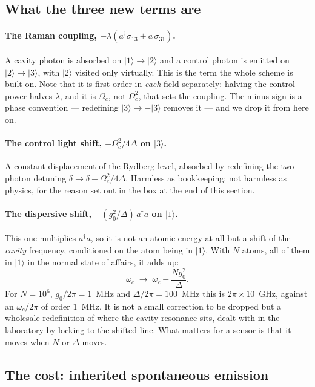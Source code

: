 \documentclass[11pt,a4paper]{article}
\newcommand{\ket}[1]{\lvert #1 \rangle}
\newcommand{\dg}{^{\dagger}}
\newcommand{\Om}{\Omega}
\begin{document}
\subsection{What the three new terms are}
\label{sec:terms}

\paragraph{The Raman coupling, $-\lambda(a\dg\sigma_{13}+a\,\sigma_{31})$.} A cavity photon is
absorbed on $\ket{1}\!\to\!\ket{2}$ and a control photon is emitted on $\ket{2}\!\to\!\ket{3}$,
with $\ket{2}$ visited only virtually. This is the term the whole scheme is built on. Note that
it is first order in \emph{each} field separately: halving the control power halves $\lambda$,
and it is $\Om_c$, not $\Om_c^2$, that sets the coupling. The minus sign is a phase convention
--- redefining $\ket{3}\to-\ket{3}$ removes it --- and we drop it from here on.

\paragraph{The control light shift, $-\Om_c^2/4\Delta$ on $\ket{3}$.} A constant displacement of
the Rydberg level, absorbed by redefining the two-photon detuning
$\delta\to\delta-\Om_c^2/4\Delta$. Harmless as bookkeeping; not harmless as physics, for the
reason set out in the box at the end of this section.

\paragraph{The dispersive shift, $-(g_0^2/\Delta)\,a\dg a$ on $\ket{1}$.} This one multiplies
$a\dg a$, so it is not an atomic energy at all but a shift of the \emph{cavity} frequency,
conditioned on the atom being in $\ket{1}$. With $N$ atoms, all of them in $\ket{1}$ in the
normal state of affairs, it adds up:
\begin{equation}
  \omega_c \;\longrightarrow\; \omega_c - \frac{Ng_0^2}{\Delta}.
\end{equation}
For $N=10^6$, $g_0/2\pi=1$~MHz and $\Delta/2\pi=100$~MHz this is $2\pi\times10$~GHz, against an
$\omega_c/2\pi$ of order $1$~MHz. It is not a small correction to be dropped but a wholesale
redefinition of where the cavity resonance sits, dealt with in the laboratory by locking to the
shifted line. What matters for a sensor is that it moves when $N$ or $\Delta$ moves.

\subsection{The cost: inherited spontaneous emission}
\end{document}
